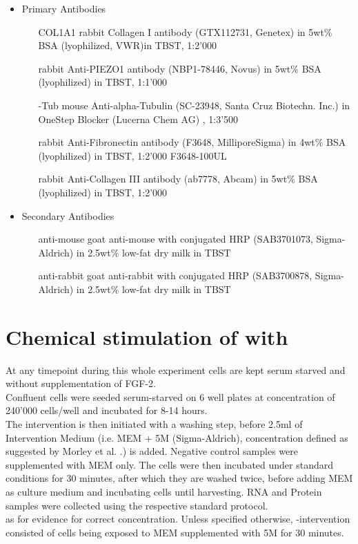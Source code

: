 \begin{itemize}
    \item Primary Antibodies
    \begin{itemize}
		\item[COL1A1] rabbit Collagen I antibody (GTX112731, Genetex) in 5wt\% BSA (lyophilized, VWR)in TBST, 1:2'000
		\item[\PiezoGene{}] rabbit Anti-PIEZO1 antibody (NBP1-78446, Novus) in 5wt\% BSA (lyophilized) in TBST, 1:1'000
		\item[\textalpha{}-Tub] mouse Anti-alpha-Tubulin (SC-23948, Santa Cruz Biotechn. Inc.) in OneStep Blocker (Lucerna Chem AG) , 1:3'500
		\item[\FnGene{}] rabbit Anti-Fibronectin antibody (F3648, MilliporeSigma) in 4wt\% BSA (lyophilized) in TBST, 1:2'000 F3648-100UL
		\item[\colthreeGene{}] rabbit Anti-Collagen III antibody (ab7778, Abcam) in 5wt\% BSA (lyophilized) in TBST, 1:2'000
    \end{itemize}

 	\item Secondary Antibodies
    \begin{itemize}
		\item[anti-mouse] goat anti-mouse with conjugated HRP (SAB3701073, Sigma-Aldrich) in 2.5wt\% low-fat dry milk in TBST 
		\item[anti-rabbit] goat anti-rabbit with conjugated HRP (SAB3700878, Sigma-Aldrich) in 2.5wt\% low-fat dry milk in TBST 
    \end{itemize}
\end{itemize}


\section{Chemical stimulation of \Piezo{} with \Yoda{}}
\label{sec:ChemicalStimulation}
At any timepoint during this whole experiment cells are kept serum starved and without supplementation of FGF-2.\\
Confluent cells were seeded serum-starved on 6 well plates at concentration of 240'000 cells/well and incubated for 8-14 hours.\\
The intervention is then initiated with a washing step, before 2.5ml of Intervention Medium (i.e. MEM\textalpha{} + 5\textmu{}M \Yoda (Sigma-Aldrich), concentration defined as suggested by Morley et al. \cite{Morley2018}.) is added. Negative control samples were supplemented with MEM\textalpha{} only. The cells were then incubated under standard conditions for 30 minutes, after which they are washed twice, before adding MEM\textalpha{} as culture medium and incubating cells until harvesting. RNA and Protein samples were collected using the respective standard protocol.\\ as for evidence for correct concentration. Unless specified otherwise, \Yoda{}-intervention consisted of cells being exposed to MEM\textalpha{} supplemented with 5\mul{}M \Yoda{} for 30 minutes. 

